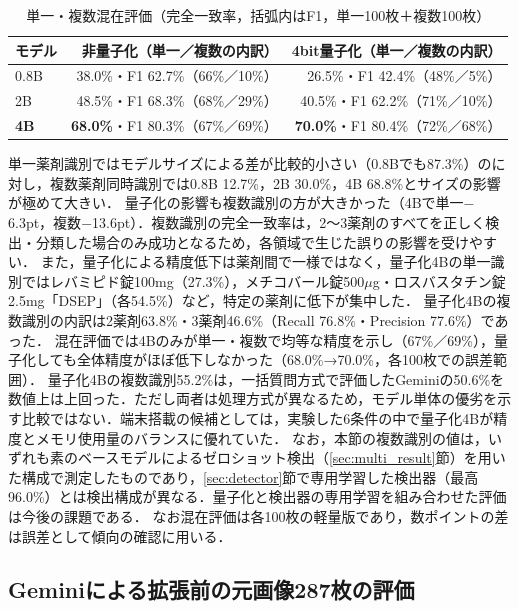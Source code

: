 \documentclass[dvipdfmx]{jsarticle}
\begin{document}
\begin{table}[htbp]
\centering
\caption{単一・複数混在評価（完全一致率，括弧内はF1，単一100枚＋複数100枚）}
\label{tab:size_mixed}
\small
\begin{tabular}{lrr}
\hline
モデル & 非量子化（単一／複数の内訳） & 4bit量子化（単一／複数の内訳） \\
\hline
0.8B & 38.0\%・F1 62.7\%（66\%／10\%） & 26.5\%・F1 42.4\%（48\%／5\%） \\
2B & 48.5\%・F1 68.3\%（68\%／29\%） & 40.5\%・F1 62.2\%（71\%／10\%） \\
\textbf{4B} & \textbf{68.0\%}・F1 80.3\%（67\%／69\%） & \textbf{70.0\%}・F1 80.4\%（72\%／68\%） \\
\hline
\end{tabular}
\end{table}

単一薬剤識別ではモデルサイズによる差が比較的小さい（0.8Bでも87.3\%）のに対し，複数薬剤同時識別では0.8B 12.7\%，2B 30.0\%，4B 68.8\%とサイズの影響が極めて大きい．
量子化の影響も複数識別の方が大きかった（4Bで単一$-$6.3pt，複数$-$13.6pt）．複数識別の完全一致率は，2〜3薬剤のすべてを正しく検出・分類した場合のみ成功となるため，各領域で生じた誤りの影響を受けやすい．
また，量子化による精度低下は薬剤間で一様ではなく，量子化4Bの単一識別ではレバミピド錠100mg（27.3\%），メチコバール錠500$\mu$g・ロスバスタチン錠2.5mg「DSEP」（各54.5\%）など，特定の薬剤に低下が集中した．
量子化4Bの複数識別の内訳は2薬剤63.8\%・3薬剤46.6\%（Recall 76.8\%・Precision 77.6\%）であった．
混在評価では4Bのみが単一・複数で均等な精度を示し（67\%／69\%），量子化しても全体精度がほぼ低下しなかった（68.0\%→70.0\%，各100枚での誤差範囲）．
量子化4Bの複数識別55.2\%は，一括質問方式で評価したGeminiの50.6\%を数値上は上回った．ただし両者は処理方式が異なるため，モデル単体の優劣を示す比較ではない．端末搭載の候補としては，実験した6条件の中で量子化4Bが精度とメモリ使用量のバランスに優れていた．
なお，本節の複数識別の値は，いずれも素のベースモデルによるゼロショット検出（\ref{sec:multi_result}節）を用いた構成で測定したものであり，\ref{sec:detector}節で専用学習した検出器（最高96.0\%）とは検出構成が異なる．量子化と検出器の専用学習を組み合わせた評価は今後の課題である．
なお混在評価は各100枚の軽量版であり，数ポイントの差は誤差として傾向の確認に用いる．

\subsection{Geminiによる拡張前の元画像287枚の評価}\label{sec:gemini_orig}
\end{document}
